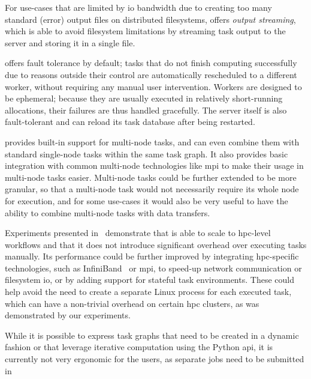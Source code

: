 \begin{description}[wide=0pt]
		For use-cases that are limited by \gls{io} bandwidth due to creating too many
		standard (error) output files on distributed filesystems, \hyperqueue{} offers
		\emph{output streaming}, which is able to avoid filesystem limitations by streaming task output
		to the server and storing it in a single file.
	\item[Fault tolerance] \hyperqueue{} offers fault tolerance by default; tasks that do not
		finish computing successfully due to reasons outside their control are automatically rescheduled to
		a different worker, without requiring any manual user intervention. Workers are designed to be
		ephemeral; because they are usually executed in relatively short-running allocations, their
		failures are thus handled gracefully. The server itself is also fault-tolerant and can reload its
		task database after being restarted.
	\item[Multi-node tasks] \hyperqueue{} provides built-in support for multi-node tasks, and
		can even combine them with standard single-node tasks within the same task graph. It also provides
		basic integration with common multi-node technologies like \gls{mpi} to make their
		usage in multi-node tasks easier. Multi-node tasks could be further extended to be more granular,
		so that a multi-node task would not necessarily require its whole node for execution, and for some
		use-cases it would also be very useful to have the ability to combine multi-node tasks with data
		transfers.
	\item[Scalability] Experiments presented in~ demonstrate that \hyperqueue{} is
		able to scale to \gls{hpc}-level workflows and that it does not introduce
		significant overhead over executing tasks manually. Its performance could be further improved by
		integrating \gls{hpc}-specific technologies, such as
		InfiniBand~\cite{infiniband} or \gls{mpi}, to speed-up network
		communication or filesystem \gls{io}, or by adding support for stateful task
		environments. These could help avoid the need to create a separate Linux process for each executed
		task, which can have a non-trivial overhead on certain \gls{hpc} clusters, as was
		demonstrated by our experiments. %
	\item[Iterative computation] While it is possible to express task graphs that need to be created in a dynamic fashion or that
		leverage iterative computation using the Python \gls{api}, it is currently not
		very ergonomic for the users, as separate \hq{} jobs need to be submitted in

\end{description}
